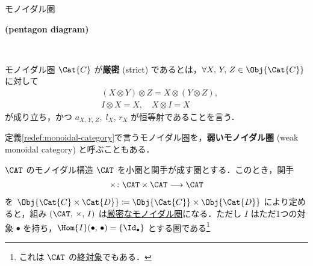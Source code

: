 \documentclass[TQFT_main]{subfiles}
\begin{document}
\begin{mydef}[label=redef:monoidal-category,breakable]{モノイダル圏}
\begin{description}
            \item[\textbf{(pentagon diagram)}]　
            
            \begin{center}
            \end{center}
            
        \end{description}
        
        \tcblower

        モノイダル圏 $\Cat{C}$ が\textbf{厳密} (strict) であるとは，$\forall X,\, Y,\, Z \in \Obj{\Cat{C}}$ に対して
        \begin{align}
            &(X \otimes Y) \otimes Z = X \otimes (Y \otimes Z), \\
            &I \otimes X = X,\quad X \otimes I = X
        \end{align}
        が成り立ち，かつ $a_{X,\, Y,\, Z},\; l_{X},\, r_X$ が恒等射であることを言う．
    \end{mydef}

    \begin{marker}
        定義\ref{redef:monoidal-category}で言うモノイダル圏を，\textbf{弱いモノイダル圏} (weak monoidal category) と呼ぶこともある．
    \end{marker}

    \begin{myexample}[label=ex:Cat-monidal]{$\CAT$ のモノイダル構造}
        $\CAT$ を小圏と関手が成す圏とする．このとき，関手
        \begin{align}
            \times \colon \CAT \times \CAT \lto \CAT
        \end{align}
        を $\Obj{\Cat{C} \times \Cat{D}} \coloneqq \Obj{\Cat{C}} \times \Obj{\Cat{D}}$ により定めると，組み $(\CAT,\, \times,\, I)$ は\hyperref[redef:monoidal-category]{厳密なモノイダル圏}になる．ただし $I$ はただ1つの対象 $\bullet$ を持ち，$\Hom{I}(\bullet,\,\bullet) = \{\Id_{\bullet}\}$ とする圏である\footnote{これは $\CAT$ の\hyperref[def:colim]{終対象}でもある．}
    \end{myexample}
\end{document}
